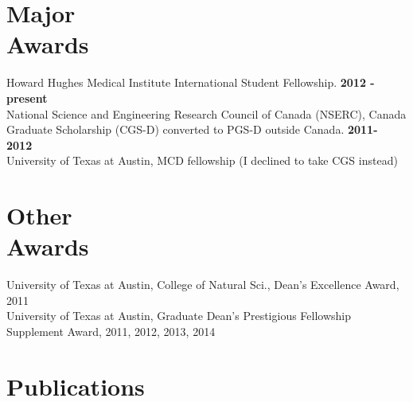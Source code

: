 \documentclass[margin,line,letterpaper]{resume}
\begin{document}
\begin{resume}
    \section{\mysidestyle Major \\Awards}
     Howard Hughes Medical Institute International Student Fellowship. \textbf{ 2012 - present}\vspace{2mm}
     \\ National Science and Engineering Research Council of Canada (NSERC), 
     Canada Graduate Scholarship (CGS-D) converted to PGS-D outside Canada. \hfill \textbf{2011- 2012} \vspace{2mm}
     \\ University of Texas at Austin, MCD fellowship (I declined to take CGS instead) 
     
     \section {\mysidestyle Other \\Awards}
     University of Texas at Austin, College of Natural Sci., Dean's Excellence Award, 2011\vspace{2mm}\\
     University of Texas at Austin, Graduate Dean's Prestigious Fellowship Supplement Award, 2011, 2012, 2013, 2014 \vspace{2mm}\\ 
    
    \renewcommand*{\thefootnote}{\fnsymbol{footnote}}
    \section{\mysidestyle Publications}


\end{resume}
\end{document}
